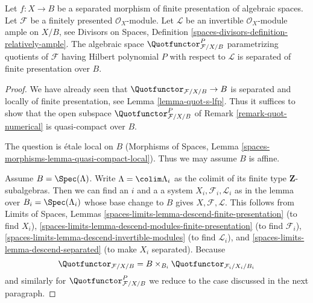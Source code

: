 \begin{lemma}
\label{lemma-quot-qc-over-base}
Let $f : X \to B$ be a separated morphism of finite presentation
of algebraic spaces. Let $\mathcal{F}$ be a finitely presented
$\mathcal{O}_X$-module. Let $\mathcal{L}$ be an invertible
$\mathcal{O}_X$-module ample on $X/B$, see
Divisors on Spaces, Definition
\ref{spaces-divisors-definition-relatively-ample}.
The algebraic space $\Quotfunctor^P_{\mathcal{F}/X/B}$
parametrizing quotients of $\mathcal{F}$
having Hilbert polynomial $P$ with respect to $\mathcal{L}$
is separated of finite presentation over $B$.
\end{lemma}

\begin{proof}
We have already seen that $\Quotfunctor_{\mathcal{F}/X/B} \to B$
is separated and locally of finite presentation, see
Lemma \ref{lemma-quot-s-lfp}. Thus it suffices to show that
the open subspace $\Quotfunctor^P_{\mathcal{F}/X/B}$
of Remark \ref{remark-quot-numerical} is quasi-compact over $B$.

\medskip\noindent
The question is \'etale local on $B$
(Morphisms of Spaces, Lemma \ref{spaces-morphisms-lemma-quasi-compact-local}).
Thus we may assume $B$ is affine.

\medskip\noindent
Assume $B = \Spec(\Lambda)$. Write $\Lambda = \colim \Lambda_i$ as the
colimit of its finite type $\mathbf{Z}$-subalgebras. Then
we can find an $i$ and a a system $X_i, \mathcal{F}_i, \mathcal{L}_i$
as in the lemma over $B_i = \Spec(\Lambda_i)$ whose base change to
$B$ gives $X, \mathcal{F}, \mathcal{L}$.
This follows from
Limits of Spaces, Lemmas
\ref{spaces-limits-lemma-descend-finite-presentation} (to find $X_i$),
\ref{spaces-limits-lemma-descend-modules-finite-presentation} (to find
$\mathcal{F}_i$), \ref{spaces-limits-lemma-descend-invertible-modules}
(to find $\mathcal{L}_i$), and \ref{spaces-limits-lemma-descend-separated}
(to make $X_i$ separated). Because
$$
\Quotfunctor_{\mathcal{F}/X/B} = B \times_{B_i}
\Quotfunctor_{\mathcal{F}_i/X_i/B_i}
$$
and similarly for $\Quotfunctor^P_{\mathcal{F}/X/B}$ we reduce
to the case discussed in the next paragraph.


\end{proof}
